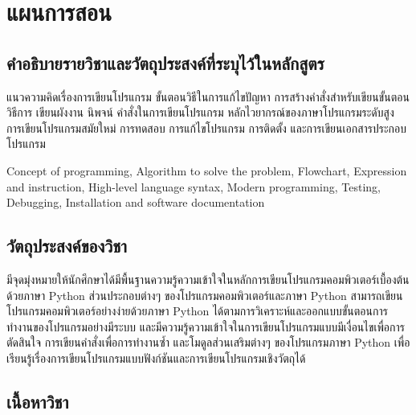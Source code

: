 \chapter{แผนการสอน}
\section*{คำอธิบายรายวิชาและวัตถุประสงค์ที่ระบุไว้ในหลักสูตร}

\begin{tcolorbox}[breakable,enhanced,fonttitle=\bfseries]
แนวความคิดเรื่องการเขียนโปรแกรม ขั้นตอนวิธีในการแก้ไขปัญหา การสร้างคำสั่งสำหรับเขียนขั้นตอนวิธีการ เขียนผังงาน นิพจน์ คำสั่งในการเขียนโปรแกรม หลักไวยากรณ์ของภาษาโปรแกรมระดับสูง การเขียนโปรแกรมสมัยใหม่ การทดสอบ การแก้ไขโปรแกรม การติดตั้ง และการเขียนเอกสารประกอบโปรแกรม

Concept of programming, Algorithm to solve the problem, Flowchart, Expression and instruction, High-level language syntax, Modern programming, Testing, Debugging, Installation and software documentation
\end{tcolorbox}

\section*{วัตถุประสงค์ของวิชา}

\begin{tcolorbox}[breakable,enhanced,fonttitle=\bfseries]
มีจุดมุ่งหมายให้นักศึกษาได้มีพื้นฐานความรู้ความเข้าใจในหลักการเขียนโปรแกรมคอมพิวเตอร์เบื้องต้นด้วยภาษา Python ส่วนประกอบต่างๆ ของโปรแกรมคอมพิวเตอร์และภาษา Python สามารถเขียนโปรแกรมคอมพิวเตอร์อย่างง่ายด้วยภาษา Python ได้ตามการวิเคราะห์และออกแบบขั้นตอนการทำงานของโปรแกรมอย่างมีระบบ และมีความรู้ความเข้าใจในการเขียนโปรแกรมแบบมีเงื่อนไขเพื่อการตัดสินใจ การเขียนคำสั่งเพื่อการทำงานซ้ำ และโมดูลส่วนเสริมต่างๆ ของโปรแกรมภาษา Python เพื่อเรียนรู้เรื่องการเขียนโปรแกรมแบบฟังก์ชันและการเขียนโปรแกรมเชิงวัตถุได้
\end{tcolorbox}
\vspace{1.5cm}

\section*{เนื้อหาวิชา}



